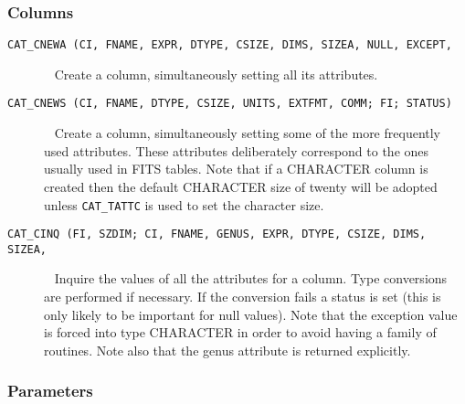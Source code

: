 \subsubsection{\label{SUBINT_COL}Columns}

\begin{description}

  \item[ {\tt CAT\_CNEWA (CI, FNAME, EXPR, DTYPE,
   CSIZE, DIMS, SIZEA, NULL, EXCEPT, } ] ~
  \newline Create a column, simultaneously setting all its attributes.

  \item[ {\tt CAT\_CNEWS (CI, FNAME, DTYPE, CSIZE, UNITS, EXTFMT, COMM;
   FI; STATUS)} ] ~
  \newline Create a column, simultaneously setting some of the more
   frequently used attributes. These attributes deliberately correspond
   to the ones usually used in FITS tables. Note that if a CHARACTER
   column is created then the default CHARACTER size of twenty will be
   adopted unless {\tt CAT\_TATTC} is used to set the character size.

  \item[ {\tt CAT\_CINQ (FI, SZDIM; CI, FNAME, GENUS, EXPR, DTYPE, 
   CSIZE, DIMS, SIZEA, } ] ~
  \newline Inquire the values of all the attributes for a column. Type 
   conversions are performed if necessary. If the conversion fails a
   status is set (this is only likely to be important for null values).
   Note that the exception value is forced into type CHARACTER in order
   to avoid having a family of routines. Note also that the genus 
   attribute is returned explicitly. 

\end{description}

\subsubsection{\label{SUBINT_PAR}Parameters}

